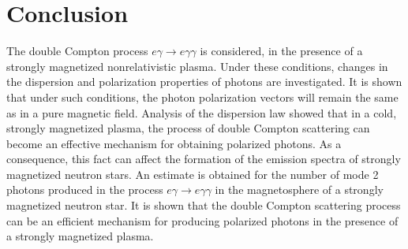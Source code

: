 \documentclass[
aps,%
12pt,%
final,%
notitlepage,%
oneside,%
onecolumn,%
nobibnotes,%
nofootinbib,%
superscriptaddress,%
noshowpacs,%
centertags]%
{revtex4}
\begin{document}
\section{Conclusion}

The double Compton process $e\gamma\to e\gamma\gamma$ is considered,
in the presence of a strongly magnetized nonrelativistic plasma.
Under these conditions, changes in the dispersion and polarization properties of photons are investigated.
It is shown that under such conditions,
the photon polarization vectors will remain the same as in a pure magnetic field.
Analysis of the dispersion law showed that in a cold, strongly magnetized plasma,
the process of double Compton scattering can become an effective mechanism for obtaining polarized photons.
As a consequence, this fact can affect the formation of the emission spectra of
strongly magnetized neutron stars.
An estimate is obtained for the number of mode 2 photons produced in the process
$e \gamma \to e \gamma \gamma$ in the magnetosphere of a strongly magnetized neutron star. It is shown that 
the double Compton scattering process can be an efficient mechanism for producing polarized photons in the 
presence of a strongly magnetized plasma.
\end{document}
